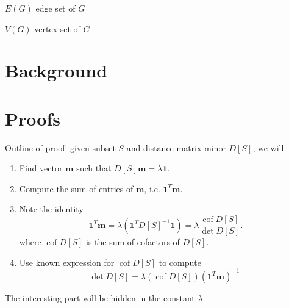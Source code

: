\documentclass{amsart}
\theoremstyle{definition}
\newcommand{\RR}{\mathbb{R}}
\newcommand{\cC}{\mathcal{C}}
\DeclareMathOperator{\cof}{cof}
\begin{document}
$E(G)$ edge set of $G$

$V(G)$ vertex set of $G$





\section{Background}


\section{Proofs}

Outline of proof: given subset $S$ and distance matrix minor $D[S]$, we will
\begin{enumerate}
\item 
Find vector $\mathbf{m}$ such that $D[S]\mathbf{m} = \lambda \mathbf{1}$.

\item 
Compute the sum of entries of $\mathbf{m}$, i.e. $\mathbf{1}^T\mathbf{m}$.

\item 
Note the identity
$$ \mathbf{1}^T \mathbf{m} 
= \lambda (\mathbf{1}^T D[S]^{-1} \mathbf{1}) 
= \lambda \frac{\cof D[S]}{\det D[S]} .$$
where $\cof D[S]$ is the sum of cofactors of $D[S]$.

\item 
Use known expression for $\cof D[S]$ to compute
$$
\det D[S] = \lambda (\cof D[S]) \left( \mathbf{1}^T \mathbf{m} \right)^{-1}.
$$
\end{enumerate}
The interesting part will be hidden in the constant $\lambda$.
\end{document}
